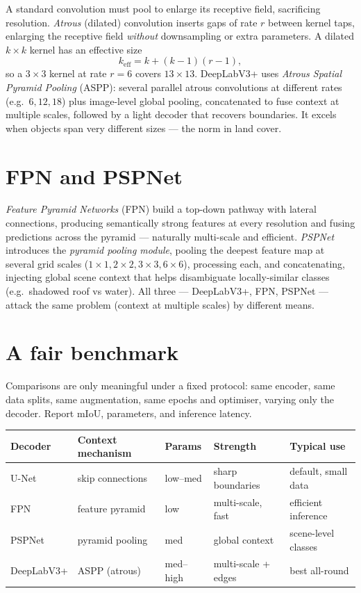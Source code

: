 A standard convolution must pool to enlarge its receptive field, sacrificing
resolution. \emph{Atrous} (dilated) convolution inserts gaps of rate $r$ between
kernel taps, enlarging the receptive field \emph{without} downsampling or extra
parameters. A dilated $k\times k$ kernel has an effective size
\begin{equation}
k_\mathrm{eff} = k + (k-1)(r-1),
\end{equation}
so a $3\times3$ kernel at rate $r{=}6$ covers $13\times13$. DeepLabV3+ uses
\emph{Atrous Spatial Pyramid Pooling} (ASPP): several parallel atrous
convolutions at different rates (e.g.\ $6,12,18$) plus image-level global
pooling, concatenated to fuse context at multiple scales, followed by a light
decoder that recovers boundaries. It excels when objects span very different
sizes --- the norm in land cover.

\section{FPN and PSPNet}

\emph{Feature Pyramid Networks} (FPN) build a top-down pathway with lateral
connections, producing semantically strong features at every resolution and
fusing predictions across the pyramid --- naturally multi-scale and efficient.
\emph{PSPNet} introduces the \emph{pyramid pooling module}, pooling the deepest
feature map at several grid scales ($1\times1, 2\times2, 3\times3, 6\times6$),
processing each, and concatenating, injecting global scene context that helps
disambiguate locally-similar classes (e.g.\ shadowed roof vs water). All three
--- DeepLabV3+, FPN, PSPNet --- attack the same problem (context at multiple
scales) by different means.

\section{A fair benchmark}

Comparisons are only meaningful under a fixed protocol: same encoder, same data
splits, same augmentation, same epochs and optimiser, varying only the decoder.
Report mIoU, parameters, and inference latency.

\begin{center}\small
\renewcommand{\arraystretch}{1.2}
\begin{tabular}{@{}lllll@{}}
\toprule
Decoder & Context mechanism & Params & Strength & Typical use\\
\midrule
U-Net & skip connections & low--med & sharp boundaries & default, small data\\
FPN & feature pyramid & low & multi-scale, fast & efficient inference\\
PSPNet & pyramid pooling & med & global context & scene-level classes\\
DeepLabV3+ & ASPP (atrous) & med--high & multi-scale + edges & best all-round\\
\bottomrule
\end{tabular}
\end{center}

